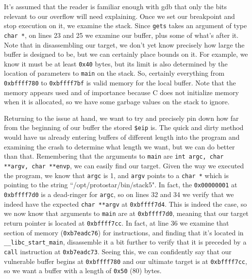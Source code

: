 It's assumed that the reader is familiar enough with gdb that only the bits relevant to our overflow
will need explaining. Once we set our breakpoint and stop execution on it, we examine the stack.
Since \texttt{gets} takes an argument of type \texttt{char *}, on lines 23 and 25 we examine our buffer, 
plus some of what's after it. Note that in disassembling our target, we don't yet know precisely
how large the buffer is designed to be, but we can certainly place bounds on it. For example,
we know it must be at least \texttt{0x40} bytes, but its limit is also determined by the
location of parameters to \texttt{main} on the stack. So, certainly everything 
from \texttt{0xbffff780} to \texttt{0xbffff7bf} is valid memory for the local buffer. Note that
the memory appears used and of importance because C does not initialize memory when it is allocated,
so we have some garbage values on the stack to ignore.

Returning to the issue at hand, we want to try and precisely pin down how far from the beginning of our
buffer the stored \texttt{\$eip} is. The quick and dirty method would have us already entering
buffers of different length into the program and examining the crash to determine what length
we want, but we can do better than that. Remembering that the arguments to \texttt{main}
are \texttt{int argc, char **argv, char **envp}, we can easily find our target. Given the
way we executed the program, we know that \texttt{argc} is 1, and \texttt{argv} points to a
\texttt{char *} which is pointing to the string ``/opt/protostar/bin/stack5". In fact, the
\texttt{0x00000001} at \texttt{0xbffff7d0} is a dead-ringer for \texttt{argc}, so on lines
32 and 34 we verify that we indeed have the expected \texttt{char **argv} at \texttt{0xbffff7d4}.
This is indeed the case, so we now know that arguments to \texttt{main} are at \texttt{0xbffff7d0},
meaning that our target return pointer is located at \texttt{0xbffff7cc}. In fact, at line 36
we examine that section of memory (\texttt{0xb7eadc76}) for instructions, and finding that it's located
in \texttt{\_\_libc\_start\_main}, disassemble it a bit further to verify that it is preceded by a 
\texttt{call} instruction at \texttt{0xb7eadc73}. Seeing this, we can confidently say that
our vulnerable buffer begins at \texttt{0xbffff780} and our ultimate target is at \texttt{0xbffff7cc},
so we want a buffer with a length of \texttt{0x50} (80) bytes. \\

%

